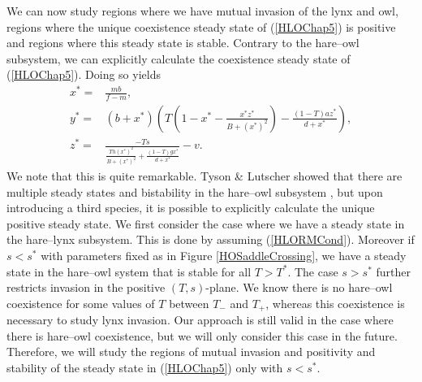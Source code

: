 \documentclass[12pt]{UOthesis}
\theoremstyle{remarkstyle}
\begin{document}
We can now study regions where we have mutual invasion of the lynx and owl, regions where the unique coexistence steady state of (\ref{HLOChap5}) is positive and regions where this steady state is stable. Contrary to the hare--owl subsystem, we can explicitly calculate the coexistence steady state of (\ref{HLOChap5}). Doing so yields
\begin{equation}
	\begin{split}
		x^*=& \frac{mb}{f-m},\\
		y^*=&(b+x^*)\left(T\left(1-x^*-\frac{x^*z^*}{B+(x^*)^2}\right)-\frac{(1-T)az^*}{d+x^*}\right),\\
		z^*=&\frac{-Ts}{\frac{Th(x^*)^2}{B+(x^*)^2}+\frac{(1-T)gx^*}{d+x^*}}-v.
	\end{split}
	\label{HLOSteadyState}
\end{equation}
We note that this is quite remarkable. Tyson \& Lutscher showed that there are multiple steady states and bistability in the hare--owl subsystem \cite{TysonLutscher}, but upon introducing a third species, it is possible to explicitly calculate the unique positive steady state. We first consider the case where we have a steady state in the hare--lynx subsystem. This is done by assuming (\ref{HLORMCond}). Moreover if $s<s^*$ with parameters fixed as in Figure \ref{HOSaddleCrossing}, we have a steady state in the hare--owl system that is stable for all $T>T^*$. The case $s>s^*$ further restricts invasion in the positive $(T,s)$-plane. We know there is no hare--owl coexistence for some values of $T$ between $T_-$ and $T_+$, whereas this coexistence is necessary to study lynx invasion. Our approach is still valid in the case where there is hare--owl coexistence, but we will only consider this case in the future. Therefore, we will study the regions of mutual invasion and positivity and stability of the steady state in (\ref{HLOChap5}) only with $s<s^*$.\\
\end{document}
